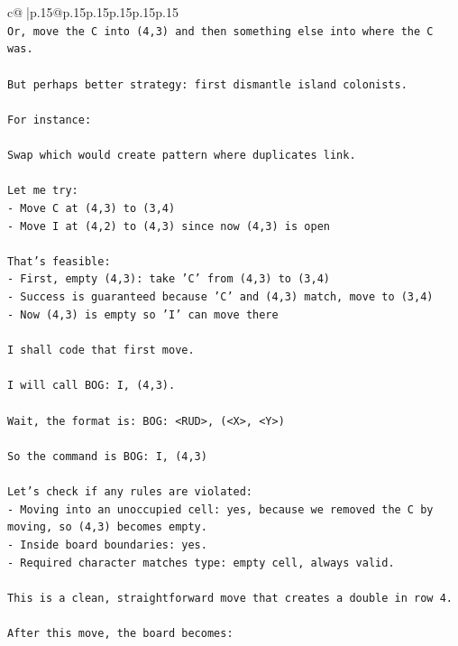 \documentclass{article}
\begin{document}
{\begin{supertabular}{c@{$\;$}|p{.15\linewidth}@{}p{.15\linewidth}p{.15\linewidth}p{.15\linewidth}p{.15\linewidth}p{.15\linewidth}}
{{{\\ 
\texttt{Or, move the C into (4,3) and then something else into where the C was.} \\
\\ 
\texttt{But perhaps better strategy: first dismantle island colonists.} \\
\\ 
\texttt{For instance:} \\
\\ 
\texttt{Swap which would create pattern where duplicates link.} \\
\\ 
\texttt{Let me try:} \\
\texttt{{-} Move C at (4,3) to (3,4)} \\
\texttt{{-} Move I at (4,2) to (4,3) since now (4,3) is open} \\
\\ 
\texttt{That's feasible:} \\
\texttt{{-} First, empty (4,3): take 'C' from (4,3) to (3,4)} \\
\texttt{{-} Success is guaranteed because 'C' and (4,3) match, move to (3,4)} \\
\texttt{{-} Now (4,3) is empty so 'I' can move there} \\
\\ 
\texttt{I shall code that first move.} \\
\\ 
\texttt{I will call BOG: I, (4,3).} \\
\\ 
\texttt{Wait, the format is: BOG: <RUD>, (<X>, <Y>)} \\
\\ 
\texttt{So the command is BOG: I, (4,3)} \\
\\ 
\texttt{Let's check if any rules are violated:} \\
\texttt{{-} Moving into an unoccupied cell: yes, because we removed the C by moving, so (4,3) becomes empty.} \\
\texttt{{-} Inside board boundaries: yes.} \\
\texttt{{-} Required character matches type: empty cell, always valid.} \\
\\ 
\texttt{This is a clean, straightforward move that creates a double in row 4.} \\
\\ 
\texttt{After this move, the board becomes:} \\
}}}
\end{supertabular}}
\end{document}
